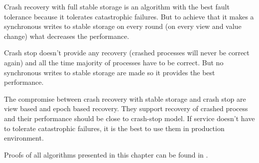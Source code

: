 Crash recovery with full stable storage is an algorithm with the best fault tolerance because it tolerates catastrophic failures. But to achieve that it makes a synchronous writes to stable storage on every round (on every view and value change) what decreases the performance.

Crash stop doesn't provide any recovery (crashed processes will never be correct again) and all the time majority of processes have to be correct. But no synchronous writes to stable storage are made so it provides the best performance.

The compromise between crash recovery with stable storage and crash stop are view based and epoch based recovery. They support recovery of crashed process and their performance should be close to crash-stop model. If service doesn't have to tolerate catastrophic failures, it is the best to use them in production environment.

Proofs of all algorithms presented in this chapter can be found in \cite{Nun10}. 
